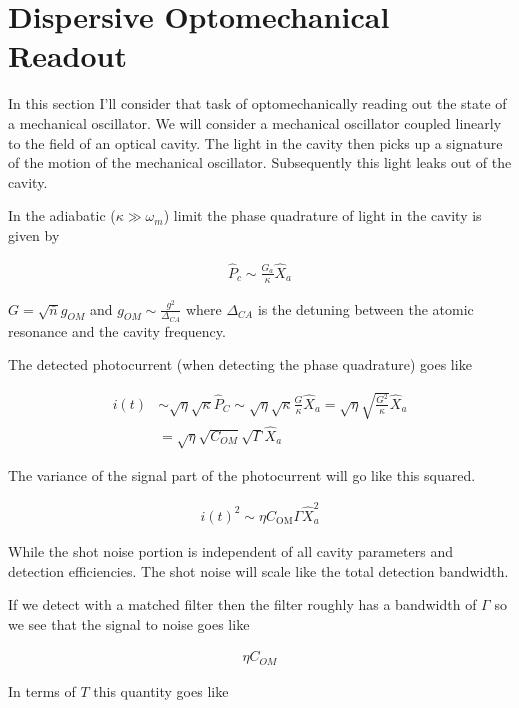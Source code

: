 \documentclass[12pt]{article}
\begin{document}
\section{Dispersive Optomechanical Readout}

In this section I'll consider that task of optomechanically reading out the state of a mechanical oscillator. We will consider a mechanical oscillator coupled linearly to the field of an optical cavity. The light in the cavity then picks up a signature of the motion of the mechanical oscillator. Subsequently this light leaks out of the cavity.

In the adiabatic ($\kappa \gg \omega_m$) limit the phase quadrature of light in the cavity is given by

\begin{align}
\hat{P}_c \sim \frac{G_a}{\kappa} \hat{X}_a 
\end{align} 

$G = \sqrt{\bar{n}}g_{OM}$ and $g_{OM} \sim \frac{g^2}{\Delta_{CA}}$ where $\Delta_{CA}$ is the detuning between the atomic resonance and the cavity frequency.
	
The detected photocurrent (when detecting the phase quadrature) goes like
	
\begin{align}
i(t) &\sim \sqrt{\eta} \sqrt{\kappa} \hat{P}_C \sim \sqrt{\eta} \sqrt{\kappa} \frac{G}{\kappa} \hat{X}_a = \sqrt{\eta} \sqrt{\frac{G^2}{\kappa}}\hat{X}_a\\
&= \sqrt{\eta} \sqrt{C_{OM}} \sqrt{\Gamma} \hat{X}_a
\end{align}

The variance of the signal part of the photocurrent will go like this squared.

\begin{align}
i(t)^2 \sim \eta C_{\text{OM}} \Gamma \hat{X}_a^2
\end{align}

While the shot noise portion is independent of all cavity parameters and detection efficiencies. The shot noise will scale like the total detection bandwidth.

If we detect with a matched filter then the filter roughly has a bandwidth of $\Gamma$ so we see that the signal to noise goes like

\begin{align}
\eta C_{OM}
\end{align}
	
In terms of $T$ this quantity goes like
\end{document}

